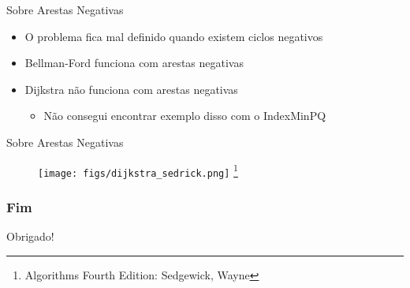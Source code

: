 \documentclass[aspectratio=169,usenames,dvipsnames]{beamer}
\begin{document}
\begin{frame}{Sobre Arestas Negativas}
    \vfill
    \begin{itemize}
        \item<1-> O problema fica mal definido quando existem ciclos negativos
        \item<2-> Bellman-Ford funciona com arestas negativas
        \item<3-> Dijkstra não funciona com arestas negativas
            \begin{itemize}
                \item<4> {\color{red} Não consegui encontrar exemplo disso com o IndexMinPQ}
            \end{itemize}
    \end{itemize}
    \vfill
\end{frame}





\begin{frame}{Sobre Arestas Negativas}

    \vfill
    \begin{figure}[ht]
    \centering
        \texttt{[image: figs/dijkstra\_sedrick.png]}
        \footnote{Algorithms Fourth Edition: Sedgewick, Wayne}
    \end{figure}
    \vfill
\end{frame}

\begin{frame}
\frametitle{Fim}
\vfill
\begin{center}
    \Huge{Obrigado!}
\end{center}
\vfill
\end{frame}
\end{document}
